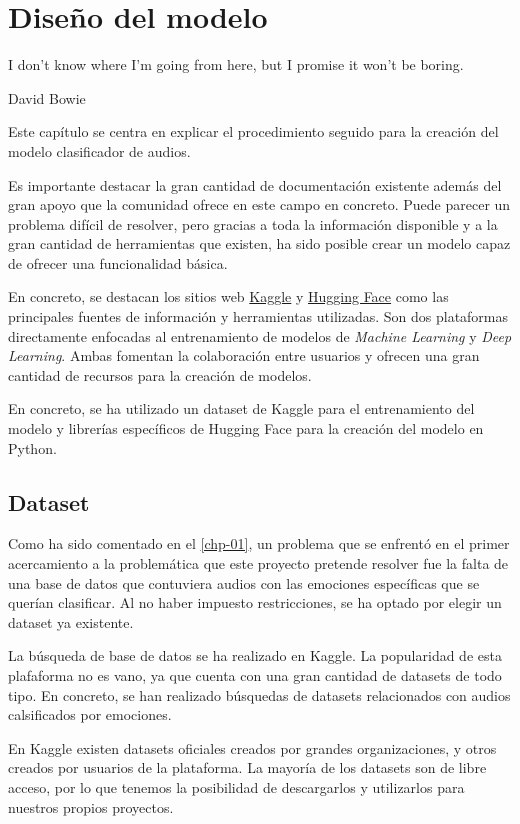 \chapter{Diseño del modelo}\label{chp-02}
\epigraph{I don't know where I'm going from here, but I promise it won't be boring.}{David Bowie}

Este capítulo se centra en explicar el procedimiento seguido para la creación del modelo clasificador de audios.

Es importante destacar la gran cantidad de documentación existente además del gran apoyo que la comunidad ofrece en este campo en concreto.
Puede parecer un problema difícil de resolver, pero gracias a toda la información disponible y a la gran cantidad de herramientas que existen, ha sido posible crear un modelo capaz de ofrecer una funcionalidad básica.

En concreto, se destacan los sitios web \href{https://www.kaggle.com/}{Kaggle} y \href{https://huggingface.co/}{Hugging Face} como las principales fuentes de información y herramientas utilizadas.
Son dos plataformas directamente enfocadas al entrenamiento de modelos de \textit{Machine Learning} y \textit{Deep Learning}.
Ambas fomentan la colaboración entre usuarios y ofrecen una gran cantidad de recursos para la creación de modelos.

En concreto, se ha utilizado un dataset de Kaggle para el entrenamiento del modelo y librerías específicos de Hugging Face para la creación del modelo en Python.


\section{Dataset}\label{seccion:dataset}
Como ha sido comentado en el \autoref{chp-01}, un problema que se enfrentó en el primer acercamiento a la problemática que este proyecto pretende resolver fue la falta de una base de datos que contuviera audios con las emociones específicas que se querían clasificar.
Al no haber impuesto restricciones, se ha optado por elegir un dataset ya existente.

La búsqueda de base de datos se ha realizado en Kaggle.
La popularidad de esta plafaforma no es vano, ya que cuenta con una gran cantidad de datasets de todo tipo.
En concreto, se han realizado búsquedas de datasets relacionados con audios calsificados por emociones.

En Kaggle existen datasets oficiales creados por grandes organizaciones, y otros creados por usuarios de la plataforma.
La mayoría de los datasets son de libre acceso, por lo que tenemos la posibilidad de descargarlos y utilizarlos para nuestros propios proyectos.

